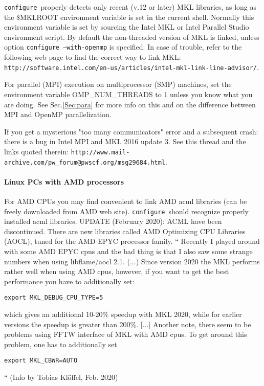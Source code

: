 \documentclass[12pt,a4paper]{article}
\def\configure{\texttt{configure}}
\begin{document}
\configure\ properly detects only recent (v.12 or later) MKL libraries,
as long as the \$MKLROOT environment variable is set in the current shell.
Normally this environment variable is set by sourcing the Intel MKL or Intel 
Parallel Studio environment script.
By default the non-threaded version of MKL is linked, unless option
\texttt{configure --with-openmp} is specified. In case of trouble,
refer to the following web page to find the correct way to link MKL:\\
\texttt{http://software.intel.com/en-us/articles/intel-mkl-link-line-advisor/}.

For parallel (MPI) execution on multiprocessor (SMP) machines, set the
environment variable OMP\_NUM\_THREADS to 1 unless you know what you
are doing. See Sec.\ref{Sec:para} for more info on this
and on the difference between MPI and OpenMP parallelization.

If you get a mysterious "too many communicators" error and a 
subsequent crash: there is a bug in Intel MPI and MKL 2016 update 3.
See this thread and the links quoted therein:
\verb|http://www.mail-archive.com/pw_forum@pwscf.org/msg29684.html|.

\paragraph{Linux PCs with AMD processors}
For AMD CPUs you may find convenient to link AMD acml libraries
(can be freely downloaded from AMD web site).
\configure\ should recognize properly installed acml libraries.
UPDATE (February 2020): ACML have been discontinued. There are new
libraries called AMD Optimizing CPU Libraries (AOCL), tuned for the
AMD EPYC processor family.
`` Recently I played around with some AMD EPYC cpus and the bad thing
is that I also saw some strange numbers when using libflame/aocl 2.1.
(...) Since version 2020 the MKL performs rather well when using AMD cpus,
 however, if you want to get the best performance you have to additionally set:
\begin{verbatim}
export MKL_DEBUG_CPU_TYPE=5
\end{verbatim}
which gives an additional 10-20\% speedup with MKL 2020,
while for earlier versions the speedup is greater than 200\%.
[...] Another note, there seem to be problems using FFTW interface
of MKL with  AMD cpus. To get around this problem, one has to
additionally set
\begin{verbatim}
export MKL_CBWR=AUTO
\end{verbatim}
`` (Info by Tobias Kl\"offel, Feb. 2020)
\end{document}

